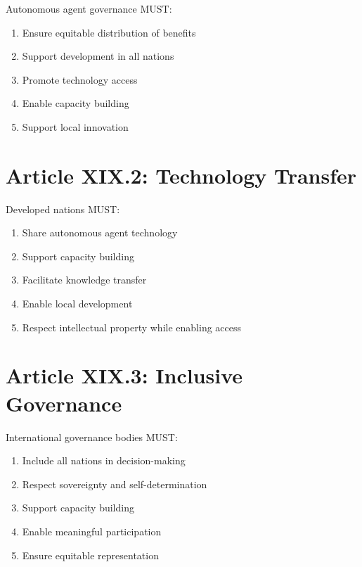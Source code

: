 \begin{articlebox}
Autonomous agent governance MUST:
\begin{enumerate}
    \item Ensure equitable distribution of benefits
    \item Support development in all nations
    \item Promote technology access
    \item Enable capacity building
    \item Support local innovation
\end{enumerate}
\end{articlebox}

\vspace{0.5cm}

\section{Article XIX.2: Technology Transfer}

\begin{articlebox}
Developed nations MUST:
\begin{enumerate}
    \item Share autonomous agent technology
    \item Support capacity building
    \item Facilitate knowledge transfer
    \item Enable local development
    \item Respect intellectual property while enabling access
\end{enumerate}
\end{articlebox}

\vspace{0.5cm}

\section{Article XIX.3: Inclusive Governance}

\begin{articlebox}
International governance bodies MUST:
\begin{enumerate}
    \item Include all nations in decision-making
    \item Respect sovereignty and self-determination
    \item Support capacity building
    \item Enable meaningful participation
    \item Ensure equitable representation
\end{enumerate}
\end{articlebox}

